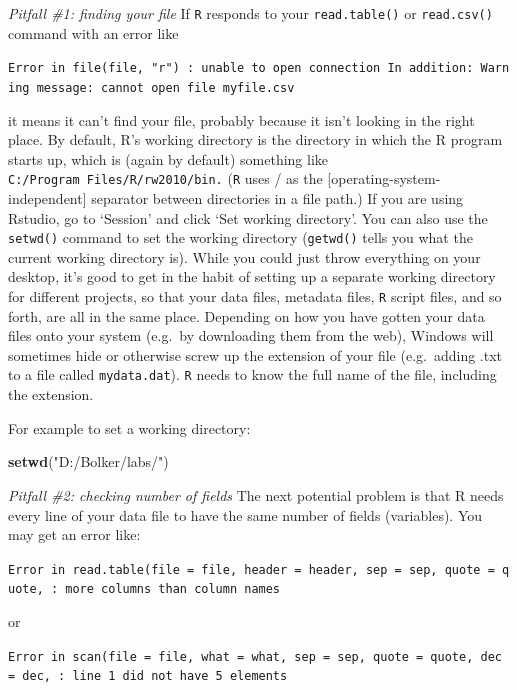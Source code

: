 \documentclass[11pt,]{article}
\newenvironment{Shaded}{\begin{snugshade}}{\end{snugshade}}
\newcommand{\KeywordTok}[1]{\textcolor[rgb]{0.13,0.29,0.53}{\textbf{#1}}}
\newcommand{\StringTok}[1]{\textcolor[rgb]{0.31,0.60,0.02}{#1}}
\newcommand{\NormalTok}[1]{#1}
\begin{document}
\emph{Pitfall \#1: finding your file} If \texttt{R} responds to your
\texttt{read.table()} or \texttt{read.csv()} command with an error like

\texttt{Error\ in\ file(file,\ "r")\ :\ unable\ to\ open\ connection\ In\ addition:\ Warning\ message:\ cannot\ open\ file\ \textquotesingle{}myfile.csv\textquotesingle{}}

it means it can't find your file, probably because it isn't looking in
the right place. By default, R's working directory is the directory in
which the R program starts up, which is (again by default) something
like \texttt{C:/Program\ Files/R/rw2010/bin.} (\texttt{R} uses / as the
{[}operating-system-independent{]} separator between directories in a
file path.) If you are using Rstudio, go to `Session' and click `Set
working directory'. You can also use the \texttt{setwd()} command to set
the working directory (\texttt{getwd()} tells you what the current
working directory is). While you could just throw everything on your
desktop, it's good to get in the habit of setting up a separate working
directory for different projects, so that your data files, metadata
files, \texttt{R} script files, and so forth, are all in the same place.
Depending on how you have gotten your data files onto your system
(e.g.~by downloading them from the web), Windows will sometimes hide or
otherwise screw up the extension of your file (e.g.~adding .txt to a
file called \texttt{mydata.dat}). \texttt{R} needs to know the full name
of the file, including the extension.

For example to set a working directory:

\begin{Shaded}
\begin{Highlighting}[]
\KeywordTok{setwd}\NormalTok{(}\StringTok{"D:/Bolker/labs/"}\NormalTok{)}
\end{Highlighting}
\end{Shaded}

\emph{Pitfall \#2: checking number of fields} The next potential problem
is that R needs every line of your data file to have the same number of
fields (variables). You may get an error like:

\texttt{Error\ in\ read.table(file\ =\ file,\ header\ =\ header,\ sep\ =\ sep,\ quote\ =\ quote,\ :\ more\ columns\ than\ column\ names}

or

\texttt{Error\ in\ scan(file\ =\ file,\ what\ =\ what,\ sep\ =\ sep,\ quote\ =\ quote,\ dec\ =\ dec,\ :\ line\ 1\ did\ not\ have\ 5\ elements}
\end{document}
